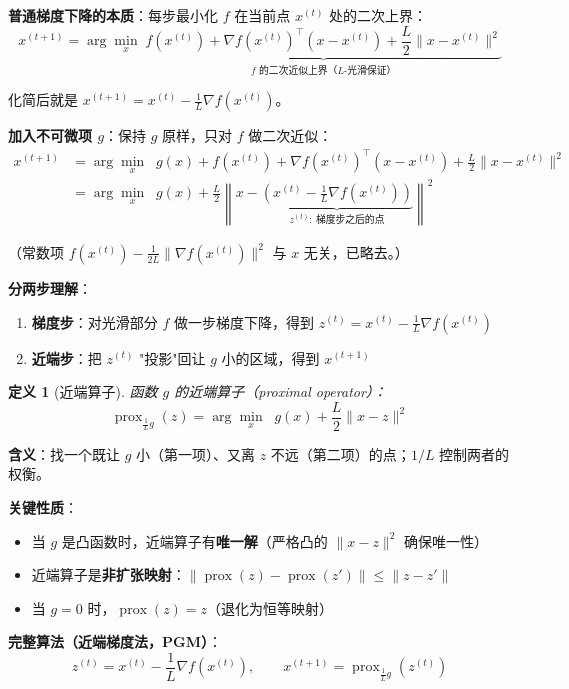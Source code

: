 \documentclass[12pt, a4paper]{ctexart}
\newtheorem{definition}[theorem]{定义}
\begin{document}
\begin{blackboard}[推导：从二次近似出发]

\textbf{普通梯度下降的本质}：每步最小化 $f$ 在当前点 $x^{(t)}$ 处的二次上界：
\[
x^{(t+1)} = \arg\min_x \; \underbrace{f(x^{(t)}) + \nabla f(x^{(t)})^\top(x - x^{(t)}) + \frac{L}{2}\|x - x^{(t)}\|^2}_{\text{$f$ 的二次近似上界（$L$-光滑保证）}}
\]

化简后就是 $x^{(t+1)} = x^{(t)} - \frac{1}{L}\nabla f(x^{(t)})$。

\textbf{加入不可微项 $g$}：保持 $g$ 原样，只对 $f$ 做二次近似：
\begin{align*}
x^{(t+1)} &= \arg\min_x \;\; g(x) + f(x^{(t)}) + \nabla f(x^{(t)})^\top(x - x^{(t)}) + \frac{L}{2}\|x - x^{(t)}\|^2 \\
&= \arg\min_x \;\; g(x) + \frac{L}{2}\left\|x - \underbrace{\left(x^{(t)} - \frac{1}{L}\nabla f(x^{(t)})\right)}_{z^{(t)}:\ \text{梯度步之后的点}}\right\|^2
\end{align*}

（常数项 $f(x^{(t)}) - \frac{1}{2L}\|\nabla f(x^{(t)})\|^2$ 与 $x$ 无关，已略去。）

\textbf{分两步理解}：
\begin{enumerate}
    \item \textbf{梯度步}：对光滑部分 $f$ 做一步梯度下降，得到 $z^{(t)} = x^{(t)} - \frac{1}{L}\nabla f(x^{(t)})$
    \item \textbf{近端步}：把 $z^{(t)}$ "投影"回让 $g$ 小的区域，得到 $x^{(t+1)}$
\end{enumerate}

\end{blackboard}

\begin{blackboard}[近端算子的定义]

\begin{definition}[近端算子]
函数 $g$ 的近端算子（proximal operator）：
\[
\operatorname{prox}_{\frac{1}{L}g}(z) = \arg\min_x \;\; g(x) + \frac{L}{2}\|x - z\|^2
\]
\end{definition}

\textbf{含义}：找一个既让 $g$ 小（第一项）、又离 $z$ 不远（第二项）的点；$1/L$ 控制两者的权衡。

\textbf{关键性质}：
\begin{itemize}
    \item 当 $g$ 是凸函数时，近端算子有\textbf{唯一解}（严格凸的 $\|x-z\|^2$ 确保唯一性）
    \item 近端算子是\textbf{非扩张映射}：$\|\operatorname{prox}(z) - \operatorname{prox}(z')\| \leq \|z - z'\|$
    \item 当 $g = 0$ 时，$\operatorname{prox}(z) = z$（退化为恒等映射）
\end{itemize}

\textbf{完整算法（近端梯度法，PGM）}：
\[
\boxed{z^{(t)} = x^{(t)} - \frac{1}{L}\nabla f(x^{(t)}), \qquad x^{(t+1)} = \operatorname{prox}_{\frac{1}{L}g}\!\left(z^{(t)}\right)}
\]

\end{blackboard}
\end{document}
